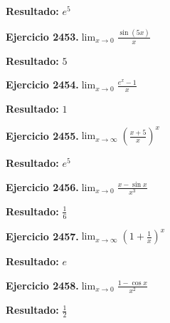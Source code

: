 \documentclass[10pt,a4paper]{article}
\begin{document}
\begin{solbox}
\textbf{Resultado:} \(\displaystyle e^{5}\)
\end{solbox}

\begin{ejbox}
\textbf{Ejercicio 2453.}\quad $\lim_{x\to 0} \frac{\sin(5x)}{x}$
\end{ejbox}

\begin{solbox}
\textbf{Resultado:} \(\displaystyle 5\)
\end{solbox}

\newpage
\begin{ejbox}
\textbf{Ejercicio 2454.}\quad $\lim_{x\to 0} \frac{e^x-1}{x}$
\end{ejbox}

\begin{solbox}
\textbf{Resultado:} \(\displaystyle 1\)
\end{solbox}

\begin{ejbox}
\textbf{Ejercicio 2455.}\quad $\lim_{x\to \infty} \left(\frac{x+5}{x}\right)^{x}$
\end{ejbox}

\begin{solbox}
\textbf{Resultado:} \(\displaystyle e^{5}\)
\end{solbox}

\begin{ejbox}
\textbf{Ejercicio 2456.}\quad $\lim_{x\to 0} \frac{x-\sin x}{x^3}$
\end{ejbox}

\begin{solbox}
\textbf{Resultado:} \(\displaystyle \frac{1}{6}\)
\end{solbox}

\newpage
\begin{ejbox}
\textbf{Ejercicio 2457.}\quad $\lim_{x\to \infty} \left(1+\frac{1}{x}\right)^x$
\end{ejbox}

\begin{solbox}
\textbf{Resultado:} \(\displaystyle e\)
\end{solbox}

\begin{ejbox}
\textbf{Ejercicio 2458.}\quad $\lim_{x\to 0} \frac{1-\cos x}{x^2}$
\end{ejbox}

\begin{solbox}
\textbf{Resultado:} \(\displaystyle \frac{1}{2}\)
\end{solbox}
\end{document}
